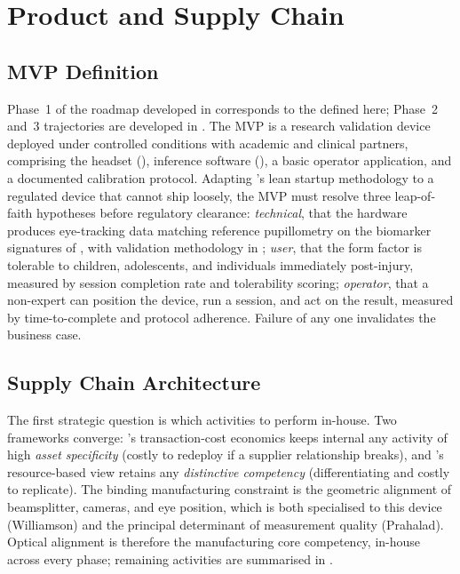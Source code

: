 \section{Product and Supply Chain}
\label{sec:ent-product-supply-chain}
\label{sec:ent-mvp}
\label{sec:ent-supply-chain}

\subsection{MVP Definition}
\label{sec:ent-mvp-definition}
\label{sec:ent-roadmap}

Phase~1 of the roadmap developed in  corresponds to the  defined here; Phase~2 and~3 trajectories are developed in . The MVP is a research validation device deployed under controlled conditions with academic and clinical partners, comprising the headset (), inference software (), a basic operator application, and a documented calibration protocol. Adapting \citet{ries2011lean}'s lean startup methodology to a regulated device that cannot ship loosely, the MVP must resolve three leap-of-faith hypotheses before regulatory clearance: \textit{technical}, that the hardware produces eye-tracking data matching reference pupillometry on the biomarker signatures of , with validation methodology in ; \textit{user}, that the form factor is tolerable to children, adolescents, and individuals immediately post-injury, measured by session completion rate and tolerability scoring; \textit{operator}, that a non-expert can position the device, run a session, and act on the result, measured by time-to-complete and protocol adherence. Failure of any one invalidates the business case.


\subsection{Supply Chain Architecture}
\label{sec:ent-sc-arch}
\label{sec:ent-sourcing-risks}

The first strategic question is which activities to perform in-house. Two frameworks converge: \citet{williamson1985institutions}'s transaction-cost economics keeps internal any activity of high \textit{asset specificity} (costly to redeploy if a supplier relationship breaks), and \citet{prahalad1990core}'s resource-based view retains any \textit{distinctive competency} (differentiating and costly to replicate). The binding manufacturing constraint is the geometric alignment of beamsplitter, cameras, and eye position, which is both specialised to this device (Williamson) and the principal determinant of measurement quality (Prahalad). Optical alignment is therefore the manufacturing core competency, in-house across every phase; remaining activities are summarised in .

